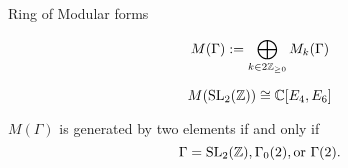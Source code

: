 \begin{frame}{Ring of Modular forms}






\begin{definition}
\[
M(\Gamma) := \bigoplus_{k \in 2\mathbb{Z}_{\geq 0}} M_k(\Gamma)
\]

\end{definition}


\begin{example}
\[
M(\operatorname{SL}_2(\mathbb{Z})) \cong \mathbb{C}[E_4,E_6]
\]
\end{example}


\begin{theorem}[Wagreich]
$M(\Gamma)$ is generated by two elements if and only if 
\[
\Gamma = \operatorname{SL}_2(\mathbb{Z}), \Gamma_0(2), \text{or } \Gamma(2).
\]

\end{theorem}








\end{frame}
